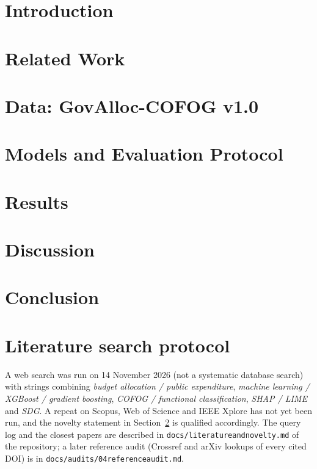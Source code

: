 \documentclass[11pt,a4paper]{article}
\DeclareRobustCommand*{\_}{\textunderscore\hskip0pt\relax}
\begin{document}
\section{Introduction}\label{sec:intro}


\section{Related Work}\label{sec:related}



\section{Data: GovAlloc-COFOG v1.0}\label{sec:data}


\section{Models and Evaluation Protocol}\label{sec:method}


\section{Results}\label{sec:results}


\section{Discussion}\label{sec:disc}


\section{Conclusion}\label{sec:conc}


\appendix
\section{Literature search protocol}
A web search was run on 14 November 2026 (not a systematic database search) with strings combining \emph{budget allocation / public expenditure}, \emph{machine learning / XGBoost / gradient boosting}, \emph{COFOG / functional classification}, \emph{SHAP / LIME} and \emph{SDG}. A repeat on Scopus, Web of Science and IEEE Xplore has not yet been run, and the novelty statement in Section~\ref{sec:related} is qualified accordingly. The query log and the closest papers are described in \texttt{docs/literature\_and\_novelty.md} of the repository; a later reference audit (Crossref and arXiv lookups of every cited DOI) is in \texttt{docs/audits/04\_reference\_audit.md}.
\end{document}
